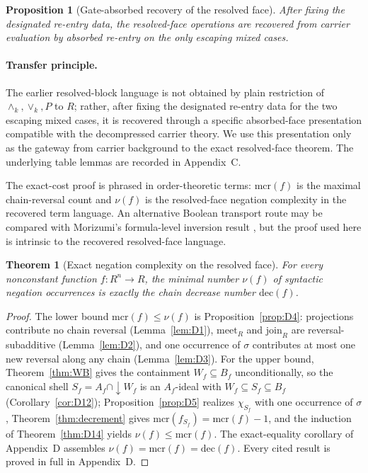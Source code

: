\documentclass[11pt]{article}
\newtheorem{theorem}{Theorem}
\newtheorem{proposition}{Proposition}
\theoremstyle{remark}
\newcommand{\meetk}{\ensuremath{\wedge_k}}
\newcommand{\joink}{\ensuremath{\vee_k}}
\newcommand{\meetR}{\ensuremath{\mathrm{meet}_R}}
\newcommand{\joinR}{\ensuremath{\mathrm{join}_R}}
\newcommand{\mcr}{\ensuremath{\mathrm{mcr}}}
\newcommand{\dec}{\ensuremath{\mathrm{dec}}}
\begin{document}
\begin{proposition}[Gate-absorbed recovery of the resolved face]
After fixing the designated re-entry data, the resolved-face operations are
recovered from carrier evaluation by absorbed re-entry on the only escaping
mixed cases.
\end{proposition}

\paragraph{Transfer principle.}
The earlier resolved-block language is not obtained by plain restriction of
$\meetk,\joink,P$ to $R$; rather, after fixing the designated re-entry data
for the two escaping mixed cases, it is recovered through a specific
absorbed-face presentation compatible with the decompressed carrier theory.
We use this presentation only as the gateway from carrier background to the
exact resolved-face theorem. The underlying table lemmas are recorded in
Appendix~C.

The exact-cost proof is phrased in order-theoretic terms: $\mcr(f)$ is the
maximal chain-reversal count and $\nu(f)$ is the resolved-face negation
complexity in the recovered term language. An alternative Boolean transport
route may be compared with Morizumi's formula-level inversion result
\cite{morizumi}, but the proof used here is intrinsic to the recovered
resolved-face language.

\begin{theorem}[Exact negation complexity on the resolved face]
\label{thm:exact}
For every nonconstant function $f:R^n\to R$, the minimal number $\nu(f)$ of
syntactic negation occurrences is exactly the chain decrease number
$\dec(f)$.
\end{theorem}

\begin{proof}
The lower bound $\mcr(f)\le\nu(f)$ is Proposition~\ref{prop:D4}:
projections contribute no chain reversal (Lemma~\ref{lem:D1}), $\meetR$
and $\joinR$ are reversal-subadditive (Lemma~\ref{lem:D2}), and one
occurrence of $\sigma$ contributes at most one new reversal along any
chain (Lemma~\ref{lem:D3}). For the upper bound,
Theorem~\ref{thm:WB} gives the containment $W_f\subseteq B_f$
unconditionally, so the canonical shell
$S_f=A_f\cap{\downarrow}W_f$ is an $A_f$-ideal with
$W_f\subseteq S_f\subseteq B_f$ (Corollary~\ref{cor:D12});
Proposition~\ref{prop:D5} realizes $\chi_{S_f}$ with one occurrence of
$\sigma$, Theorem~\ref{thm:decrement} gives $\mcr(f_{S_f})=\mcr(f)-1$,
and the induction of Theorem~\ref{thm:D14} yields $\nu(f)\le\mcr(f)$. The
exact-equality corollary of Appendix~D assembles
$\nu(f)=\mcr(f)=\dec(f)$. Every cited result is proved in full in
Appendix~D.
\end{proof}
\end{document}
